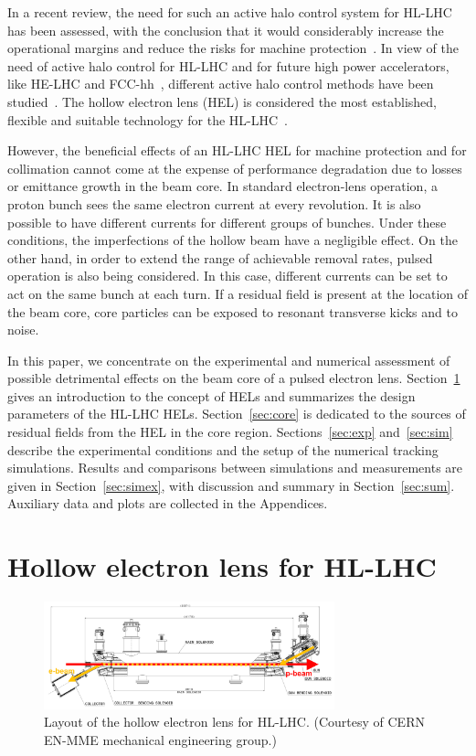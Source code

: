 \documentclass[%
 reprint,
 amsmath,amssymb,
 aps,
prstab,
longbibliography
]{revtex4-1}
\begin{document}
In a recent review, the need for such an active halo control system
for HL-LHC has been assessed, with the conclusion that it would
considerably increase the operational margins and reduce the risks for
machine protection~\cite{helreview}. In view of the need of active
halo control for HL-LHC and for future high power accelerators, like
HE-LHC and FCC-hh~\cite{helhcparam2011, fcc_coll_ipac2017}, different
active halo control methods have been
studied~\cite{helreview_bruce}. The hollow electron lens (HEL) is
considered the most established, flexible and suitable technology for
the HL-LHC~\cite{hel_tevatron_stancari, helreview}.

However, the beneficial effects of an HL-LHC HEL for machine
protection and for collimation cannot come at the expense of
performance degradation due to losses or emittance growth in the beam
core. In standard electron-lens operation, a proton bunch sees the
same electron current at every revolution. It is also possible to have
different currents for different groups of bunches. Under these
conditions, the imperfections of the hollow beam have a negligible
effect. On the other hand, in order to extend the range of achievable
removal rates, pulsed operation is also being considered. In this
case, different currents can be set to act on the same bunch at each
turn. If a residual field is present at the location of the beam core,
core particles can be exposed to resonant transverse kicks and to
noise.

In this paper, we concentrate on the experimental and numerical
assessment of possible detrimental effects on the beam core of a
pulsed electron lens. Section~\ref{sec:hel} gives an introduction to
the concept of HELs and summarizes the design parameters of the HL-LHC
HELs. Section~\ref{sec:core} is dedicated to the sources of residual
fields from the HEL in the core region. Sections~\ref{sec:exp}
and~\ref{sec:sim} describe the experimental conditions and the setup
of the numerical tracking simulations. Results and comparisons between
simulations and measurements are given in Section~\ref{sec:simex},
with discussion and summary in Section~\ref{sec:sum}. Auxiliary data
and plots are collected in the Appendices.



\section{Hollow electron lens for HL-LHC}
\label{sec:hel}

\begin{figure}
  \includegraphics[width=0.75\textwidth]{hel_layout_epbeam}
  \caption{Layout of the hollow electron lens for HL-LHC. (Courtesy of
    CERN EN-MME mechanical engineering group.)}
  \label{fig:hel_layout}
\end{figure}
\end{document}
